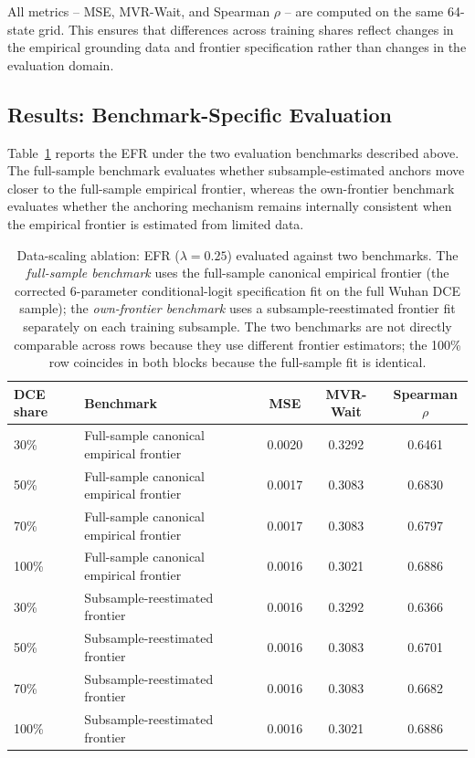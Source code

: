 \documentclass[11pt]{article}
\begin{document}
All metrics -- MSE, MVR-Wait, and Spearman \(\rho\) -- are computed on the same 64-state grid. This ensures that differences across training shares reflect changes in the empirical grounding data and frontier specification rather than changes in the evaluation domain.
\subsection{Results: Benchmark-Specific Evaluation}
\label{app:results_vs_full}

Table~\ref{tab:S8} reports the EFR under the two evaluation benchmarks described above. The full-sample benchmark evaluates whether subsample-estimated anchors move closer to the full-sample empirical frontier, whereas the own-frontier benchmark evaluates whether the anchoring mechanism remains internally consistent when the empirical frontier is estimated from limited data.

\begin{table}[htbp]
\centering
\caption{Data-scaling ablation: EFR ($\lambda = 0.25$) evaluated against two benchmarks. The \emph{full-sample benchmark} uses the full-sample canonical empirical frontier (the corrected 6-parameter conditional-logit specification fit on the full Wuhan DCE sample); the \emph{own-frontier benchmark} uses a subsample-reestimated frontier fit separately on each training subsample. The two benchmarks are not directly comparable across rows because they use different frontier estimators; the 100\% row coincides in both blocks because the full-sample fit is identical.}
\label{tab:S8}
\begin{tabular}{llccc}
\toprule
DCE share & Benchmark & MSE & MVR-Wait & Spearman $\rho$ \\
\midrule
30\% & Full-sample canonical empirical frontier & 0.0020 & 0.3292 & 0.6461 \\
50\% & Full-sample canonical empirical frontier & 0.0017 & 0.3083 & 0.6830 \\
70\% & Full-sample canonical empirical frontier & 0.0017 & 0.3083 & 0.6797 \\
100\% & Full-sample canonical empirical frontier & 0.0016 & 0.3021 & 0.6886 \\
\midrule
30\% & Subsample-reestimated frontier & 0.0016 & 0.3292 & 0.6366 \\
50\% & Subsample-reestimated frontier & 0.0016 & 0.3083 & 0.6701 \\
70\% & Subsample-reestimated frontier & 0.0016 & 0.3083 & 0.6682 \\
100\% & Subsample-reestimated frontier & 0.0016 & 0.3021 & 0.6886 \\
\bottomrule
\end{tabular}
\end{table}
\end{document}
